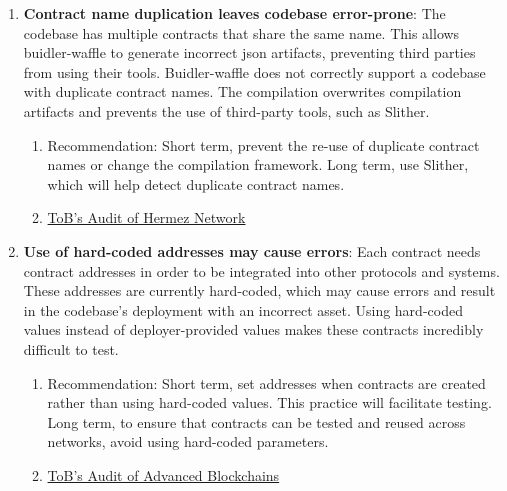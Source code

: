 \begin{enumerate}
\item\textbf{Contract name duplication leaves codebase error-prone}: The codebase has multiple contracts that share the same name. This allows buidler-waffle to generate incorrect json artifacts, preventing third parties from using their tools. Buidler-waffle does not correctly support a codebase with duplicate contract names. The compilation overwrites compilation artifacts and prevents the use of third-party tools, such as Slither.
	\begin{enumerate}
	\item Recommendation: Short term, prevent the re-use of duplicate contract names or change the compilation framework. Long term, use Slither, which will help detect duplicate contract names.
	\item\href{https://github.com/trailofbits/publications/blob/master/reviews/hermez.pdf}{ToB's Audit of Hermez Network}
	\end{enumerate}

\item\textbf{Use of hard-coded addresses may cause errors}: Each contract needs contract addresses in order to be integrated into other protocols and systems. These addresses are currently hard-coded, which may cause errors and result in the codebase’s deployment with an incorrect asset. Using hard-coded values instead of deployer-provided values makes these contracts incredibly difficult to test.
	\begin{enumerate}
	\item Recommendation: Short term, set addresses when contracts are created rather than using hard-coded values. This practice will facilitate testing. Long term, to ensure that contracts can be tested and reused across networks, avoid using hard-coded parameters.
	\item\href{https://github.com/trailofbits/publications/blob/master/reviews/AdvancedBlockchain.pdf}{ToB's Audit of Advanced Blockchains}
	\end{enumerate}


\end{enumerate}
